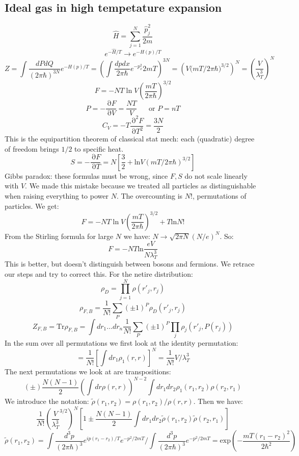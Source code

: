 \documentclass[12 pt]{article}
\DeclareMathOperator {\p} {\partial}
\begin{document}
\subsection*{Ideal gas in high tempetature expansion}
\[        \hat H = \sum_{j=1}^N \frac{\hat p_j^2}{2m}     \]
\[    e^{-\hat H/T} \to e^{-H(p)/T}     \]
\[    Z  = \int \frac{dPdQ}{(2\pi\hbar)^{3N}}   e^{-H(p)/T} =  \left( \int \frac{dp dx}{2\pi\hbar} e^{-p_x^2}{2mT} \right)^{3N}   = \left( V \big( mT/2\pi\hbar \big)^{3/2}  \right)^N  = \left( \frac{V}{\lambda_T^3} \right)^N \]
\[      F = - NT\; \text{ln}\; V \left( \frac{mT}{2\pi\hbar} \right)^{3/2}       \]
\[      P = - \frac{\p F}{\p V} = \frac{NT}{V}  \;\;\;\;\;\; \text{or } P = nT    \]
\[       C_V = - T \frac{\p^2 F}{\p T^2} = \frac{3N}{2}       \]
This is the equipartition theorem of classical stat mech: each (quadratic) degree of freedom brings $1/2$ to specific heat.
\[      S = - \frac{\p F}{\p T} = N \left[  \frac{3}{2} + \text{ln} V (mT/2\pi\hbar)^{3/2}  \right]    \]
Gibbs paradox: these formulas must be wrong, since $F,S$ do not scale linearly with $V$. We made this mistake because we treated all particles as distinguishable when raising everything to power $N$. The overcounting is $N!$, permutations of particles. We get:
\[         F = - NT\; \text{ln}\; V \left( \frac{mT}{2\pi\hbar} \right)^{3/2}   + T\text{ln} N!        \]
From the Stirling formula for large $N$ we have: $N \to \sqrt{2\pi N} (N/e)^N$. So:
\[      F = - NT \text{ln} \frac{eV}{N \lambda_T^3}       \]
This is better, but doesn't distinguish between bosons and fermions. We retrace our steps and try to correct this. For the netire distribution:
\[       \rho_D =   \prod_{j=1}^N \rho (r'_j , r_j)   \]
\[       \rho_{F,B} = \frac{1}{N!} \sum_P (\pm 1)^P \rho_D(r'_j, r_j)      \]
\[     Z_{F,B} = \text{Tr} \rho_{F,B} = \int dr_1 \dots dr_n \frac{1}{N!} \sum_P (\pm 1)^P \prod_j  \rho_j (r'_j, P( r_j))   \]
In the sum over all permutations we first look at the identity permutation:
\[        = \frac{1}{N!}  \left[ \int   dr_1 \rho_1(r,r)  \right]^N  = \frac{1}{N!} V/\lambda_T^3 \]
The next permutations we look at are transpositions:
\[     (\pm) \frac{N(N-1)}{2} \left( \int dr \rho(r,r) \right)^{N-2}  \int dr_1 dr_2 \rho_1(r_1, r_2) \rho(r_2, r_1)        \]
We introduce the notation: $\tilde \rho(r_1, r_2) = \rho(r_1, r_2) / \rho(r,r)$. Then we have:
\[      \frac{1}{N!} \left(  \frac{V}{\lambda_T^3}^{3/2}  \right)^N \left[  1 \pm \frac{N(N-1)}{2}  \int dr_1 dr_2 \tilde \rho (r_1, r_2) \tilde \rho(r_2, r_1) \right]  \]
\[       \tilde \rho(r_1, r_2) = \int \frac{d^3 p}{(2\pi \hbar)^3} e^{ip(r_1-r_2)/T} e^{- p^2 /2mT}   /  \int \frac{d^3 p}{(2\pi \hbar)^3} e^{- p^2 /2mT} = \text{exp} \left(  - \frac{mT(r_1 - r_2)^2}{2\hbar^2} \right)     \]
\end{document}

